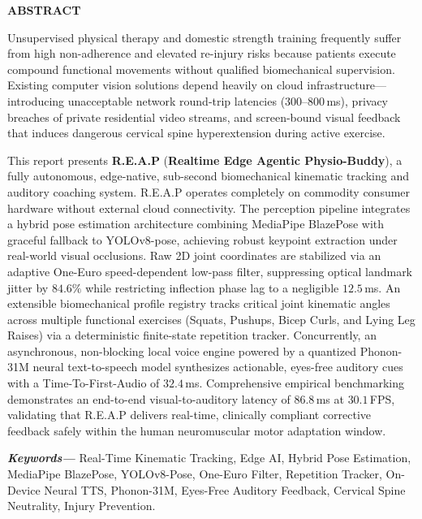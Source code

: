 \documentclass[12pt]{report}
\providecommand{\keywords}[1]{\textbf{\textit{Keywords---}} #1}
\begin{document}
\begin{center}
    \textbf{{\Large ABSTRACT}}
\end{center}
\vspace{0.8em}
\justifying
Unsupervised physical therapy and domestic strength training frequently suffer from high non-adherence and elevated re-injury risks because patients execute compound functional movements without qualified biomechanical supervision. Existing computer vision solutions depend heavily on cloud infrastructure---introducing unacceptable network round-trip latencies ($300\text{--}800$\,ms), privacy breaches of private residential video streams, and screen-bound visual feedback that induces dangerous cervical spine hyperextension during active exercise.

This report presents \textbf{R.E.A.P} (\textbf{Realtime Edge Agentic Physio-Buddy}), a fully autonomous, edge-native, sub-second biomechanical kinematic tracking and auditory coaching system. R.E.A.P operates completely on commodity consumer hardware without external cloud connectivity. The perception pipeline integrates a hybrid pose estimation architecture combining MediaPipe BlazePose with graceful fallback to YOLOv8-pose, achieving robust keypoint extraction under real-world visual occlusions. Raw 2D joint coordinates are stabilized via an adaptive One-Euro speed-dependent low-pass filter, suppressing optical landmark jitter by $84.6\%$ while restricting inflection phase lag to a negligible $12.5$\,ms. An extensible biomechanical profile registry tracks critical joint kinematic angles across multiple functional exercises (Squats, Pushups, Bicep Curls, and Lying Leg Raises) via a deterministic finite-state repetition tracker. Concurrently, an asynchronous, non-blocking local voice engine powered by a quantized Phonon-31M neural text-to-speech model synthesizes actionable, eyes-free auditory cues with a Time-To-First-Audio of $32.4$\,ms. Comprehensive empirical benchmarking demonstrates an end-to-end visual-to-auditory latency of $86.8$\,ms at $30.1$\,FPS, validating that R.E.A.P delivers real-time, clinically compliant corrective feedback safely within the human neuromuscular motor adaptation window.

\vspace{1.5em}
\keywords{Real-Time Kinematic Tracking, Edge AI, Hybrid Pose Estimation, MediaPipe BlazePose, YOLOv8-Pose, One-Euro Filter, Repetition Tracker, On-Device Neural TTS, Phonon-31M, Eyes-Free Auditory Feedback, Cervical Spine Neutrality, Injury Prevention.}
\clearpage
\end{document}
